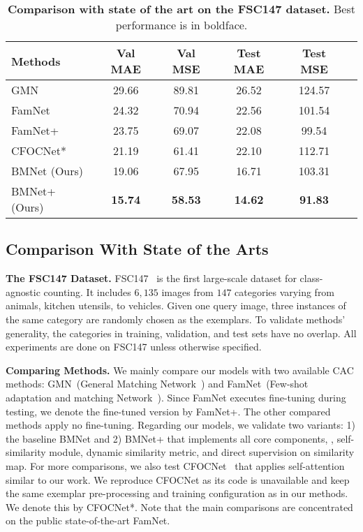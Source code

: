 \documentclass[10pt,twocolumn,letterpaper]{article}
\newcommand{\margin}{\vspace{3pt}\noindent}
\begin{document}
\begin{table}
	\centering
	\renewcommand{\arraystretch}{1.2} 
	\addtolength{\tabcolsep}{-4pt}
	\begin{tabular}{@{}lccccc@{}}
		\toprule
		Methods   & Val MAE & Val MSE & Test MAE & Test MSE \\ 
		\midrule
		GMN~\cite{gmn}       & 29.66   & 89.81   & 26.52 & 124.57      \\
		FamNet~\cite{famnet}    & 24.32   & 70.94   & 22.56  & 101.54  \\
		FamNet+~\cite{famnet}   & 23.75   & 69.07   & 22.08  & 99.54   \\
		CFOCNet*~\cite{cfocnet} & 21.19   & 61.41   & 22.10  & 112.71  \\
		BMNet (Ours) & 19.06 & 67.95 & 16.71 & 103.31 \\
		BMNet+ (Ours) & \textbf{15.74} & \textbf{58.53} & \textbf{14.62} & \textbf{91.83} \\ 
		\bottomrule
	\end{tabular}
	\vspace{-10pt}
	\caption{\textbf{Comparison with state of the art on the FSC147 dataset.} Best performance is in boldface.}
	\label{tab:comparison-CAC-methods}
	\vspace{-5pt}
\end{table}

\subsection{Comparison With State of the Arts}
\label{section:comparison-CAC-methods}

\noindent\textbf{The FSC147 Dataset.}
FSC147~\cite{famnet} is the first large-scale dataset for class-agnostic counting. It includes $6,135$ images from $147$ categories varying from animals, kitchen utensils, to vehicles. Given one query image, three instances of the same category are randomly chosen as the exemplars. To validate methods' generality, the categories in training, validation, and test sets have no overlap. All experiments are done on FSC147 unless otherwise specified.

\margin
\textbf{Comparing Methods.}
We mainly compare our models with two available CAC methods: GMN~(General Matching Network~\cite{gmn}) and FamNet~(Few-shot adaptation and matching Network~\cite{famnet}). Since FamNet executes fine-tuning during testing, we denote the fine-tuned version by FamNet+. The other compared methods apply no fine-tuning. Regarding our models, we validate two variants: 1) the baseline BMNet and 2) BMNet+ that implements all core components, \ie, self-similarity module, dynamic similarity metric, and direct supervision on similarity map.
For more comparisons, we also test CFOCNet~\cite{cfocnet} that applies self-attention similar to our work. We reproduce CFOCNet as its code is unavailable and keep the same exemplar pre-processing and training configuration as in our methods. We denote this by CFOCNet*.
Note that the main comparisons are concentrated on the public state-of-the-art FamNet.
\end{document}
